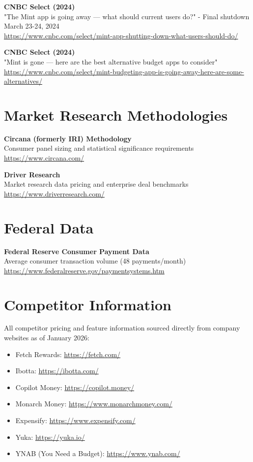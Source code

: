 \documentclass[11pt,a4paper]{report}
\begin{document}
\textbf{CNBC Select (2024)}\\
"The Mint app is going away — what should current users do?" - Final shutdown March 23-24, 2024\\
\url{https://www.cnbc.com/select/mint-app-shutting-down-what-users-should-do/}

\textbf{CNBC Select (2024)}\\
"Mint is gone — here are the best alternative budget apps to consider"\\
\url{https://www.cnbc.com/select/mint-budgeting-app-is-going-away-here-are-some-alternatives/}

\section*{Market Research Methodologies}

\textbf{Circana (formerly IRI) Methodology}\\
Consumer panel sizing and statistical significance requirements\\
\url{https://www.circana.com/}

\textbf{Driver Research}\\
Market research data pricing and enterprise deal benchmarks\\
\url{https://www.driverresearch.com/}

\section*{Federal Data}

\textbf{Federal Reserve Consumer Payment Data}\\
Average consumer transaction volume (48 payments/month)\\
\url{https://www.federalreserve.gov/paymentsystems.htm}

\section*{Competitor Information}

All competitor pricing and feature information sourced directly from company websites as of January 2026:
\begin{itemize}[leftmargin=2em, itemsep=2pt]
    \item Fetch Rewards: \url{https://fetch.com/}
    \item Ibotta: \url{https://ibotta.com/}
    \item Copilot Money: \url{https://copilot.money/}
    \item Monarch Money: \url{https://www.monarchmoney.com/}
    \item Expensify: \url{https://www.expensify.com/}
    \item Yuka: \url{https://yuka.io/}
    \item YNAB (You Need a Budget): \url{https://www.ynab.com/}
\end{itemize}
\end{document}
